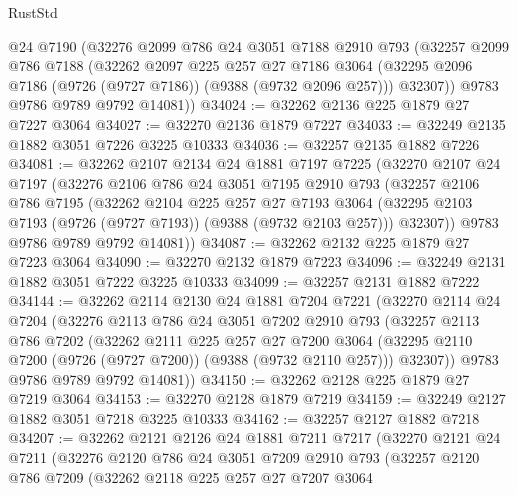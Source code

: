 \begin{lexlean}{RustStd}
\begin{coremodule}
      @24
      @7190
      (@32276
        @2099
        @786
        @24
        @3051
        @7188
        @2910
        @793
        (@32257
          @2099
          @786
          @7188
          (@32262
            @2097
            @225
            @257
            @27
            @7186
            @3064
            (@32295 @2096 @7186 (@9726 (@9727 @7186)) (@9388 (@9732 @2096 @257)))
            @32307))
        @9783
        @9786
        @9789
        @9792
        @14081))
@34024 := @32262 @2136 @225 @1879 @27 @7227 @3064
@34027 := @32270 @2136 @1879 @7227
@34033 := @32249 @2135 @1882 @3051 @7226 @3225 @10333
@34036 := @32257 @2135 @1882 @7226
@34081 := @32262
    @2107
    @2134
    @24
    @1881
    @7197
    @7225
    (@32270
      @2107
      @24
      @7197
      (@32276
        @2106
        @786
        @24
        @3051
        @7195
        @2910
        @793
        (@32257
          @2106
          @786
          @7195
          (@32262
            @2104
            @225
            @257
            @27
            @7193
            @3064
            (@32295 @2103 @7193 (@9726 (@9727 @7193)) (@9388 (@9732 @2103 @257)))
            @32307))
        @9783
        @9786
        @9789
        @9792
        @14081))
@34087 := @32262 @2132 @225 @1879 @27 @7223 @3064
@34090 := @32270 @2132 @1879 @7223
@34096 := @32249 @2131 @1882 @3051 @7222 @3225 @10333
@34099 := @32257 @2131 @1882 @7222
@34144 := @32262
    @2114
    @2130
    @24
    @1881
    @7204
    @7221
    (@32270
      @2114
      @24
      @7204
      (@32276
        @2113
        @786
        @24
        @3051
        @7202
        @2910
        @793
        (@32257
          @2113
          @786
          @7202
          (@32262
            @2111
            @225
            @257
            @27
            @7200
            @3064
            (@32295 @2110 @7200 (@9726 (@9727 @7200)) (@9388 (@9732 @2110 @257)))
            @32307))
        @9783
        @9786
        @9789
        @9792
        @14081))
@34150 := @32262 @2128 @225 @1879 @27 @7219 @3064
@34153 := @32270 @2128 @1879 @7219
@34159 := @32249 @2127 @1882 @3051 @7218 @3225 @10333
@34162 := @32257 @2127 @1882 @7218
@34207 := @32262
    @2121
    @2126
    @24
    @1881
    @7211
    @7217
    (@32270
      @2121
      @24
      @7211
      (@32276
        @2120
        @786
        @24
        @3051
        @7209
        @2910
        @793
        (@32257
          @2120
          @786
          @7209
          (@32262
            @2118
            @225
            @257
            @27
            @7207
            @3064

\end{coremodule}
\end{lexlean}
